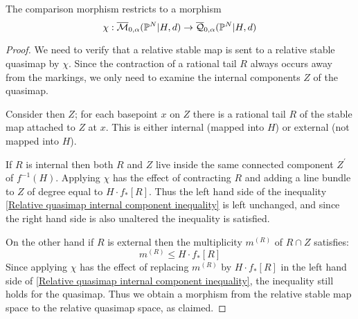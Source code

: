 \begin{lem}\label{lem:comparison}
The comparison morphism restricts to a morphism 
\begin{equation*} \chi: \overline{\mathcal M}_{0,\alpha}(\mathbb P^N|H,d)\rightarrow \overline{\mathcal Q}_{0,\alpha}(\mathbb P^N|H,d) \end{equation*}
\end{lem}
\begin{proof}
We need to verify that a relative stable map is sent to a relative stable quasimap by $\chi$. Since the contraction of a rational tail $R$ always occurs away from the markings, we only need to examine the internal components $Z$ of the quasimap.

Consider then $Z$; for each basepoint $x$ on $Z$ there is a rational tail $R$ of the stable map attached to $Z$ at $x$. This is either internal (mapped into $H$) or external (not mapped into $H$).

If $R$ is internal then both $R$ and $Z$ live inside the same connected component $Z^\prime$ of $f^{-1}(H)$. Applying $\chi$ has the effect of contracting $R$ and adding a line bundle to $Z$ of degree equal to $H \cdot f_* [R]$. Thus the left hand side of the inequality \eqref{Relative quasimap internal component inequality} is left unchanged, and since the right hand side is also unaltered the inequality is satisfied.

On the other hand if $R$ is external then the multiplicity $m^{(R)}$ of $R \cap Z$ satisfies:
\begin{equation*} m^{(R)} \leq H \cdot f_* [R] \end{equation*}
Since applying $\chi$ has the effect of replacing $m^{(R)}$ by $H \cdot f_* [R]$ in the left hand side of \eqref{Relative quasimap internal component inequality}, the inequality still holds for the quasimap. Thus we obtain a morphism from the relative stable map space to the relative quasimap space, as claimed.
\end{proof}

